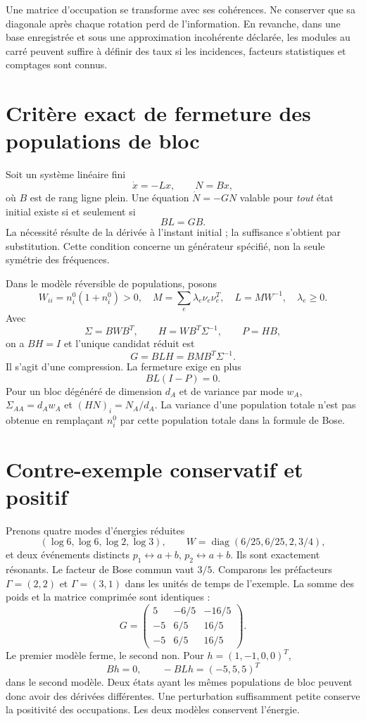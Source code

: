 \documentclass[11pt,a4paper]{article}
\begin{document}
Une matrice d'occupation se transforme avec ses cohérences. Ne conserver
que sa diagonale après chaque rotation perd de l'information.
En revanche, dans une base enregistrée et sous une approximation
incohérente déclarée, les modules au carré peuvent suffire à définir
des taux si les incidences, facteurs statistiques et comptages sont connus.

\section{Critère exact de fermeture des populations de bloc}
Soit un système linéaire fini
\[
 \dot x=-Lx,\qquad N=Bx,
\]
où $B$ est de rang ligne plein. Une équation $\dot N=-GN$ valable pour
\emph{tout} état initial existe si et seulement si
\[
                         BL=GB.
\]
La nécessité résulte de la dérivée à l'instant initial ; la suffisance
s'obtient par substitution. Cette condition concerne un générateur
spécifié, non la seule symétrie des fréquences.

Dans le modèle réversible de populations, posons
\[
 W_{ii}=n_i^0(1+n_i^0)>0,\quad
 M=\sum_e\lambda_e\nu_e\nu_e^T,\quad L=MW^{-1},\quad \lambda_e\ge0.
\]
Avec
\[
 \Sigma=BWB^T,\qquad H=WB^T\Sigma^{-1},\qquad P=HB,
\]
on a $BH=I$ et l'unique candidat réduit est
\[
 G=BLH=BMB^T\Sigma^{-1}.
\]
Il s'agit d'une compression. La fermeture exige en plus
\[
                         BL(I-P)=0.
\]
Pour un bloc dégénéré de dimension $d_A$ et de variance par mode $w_A$,
$\Sigma_{AA}=d_Aw_A$ et $(HN)_i=N_A/d_A$.
La variance d'une population totale n'est pas obtenue en remplaçant
$n_i^0$ par cette population totale dans la formule de Bose.

\section{Contre-exemple conservatif et positif}
Prenons quatre modes d'énergies réduites
\[
 (\log6,\log6,\log2,\log3),\qquad
 W=\operatorname{diag}(6/25,6/25,2,3/4),
\]
et deux événements distincts $p_1\leftrightarrow a+b$,
$p_2\leftrightarrow a+b$. Ils sont exactement résonants.
Le facteur de Bose commun vaut $3/5$. Comparons les préfacteurs
$\Gamma=(2,2)$ et $\Gamma=(3,1)$ dans les unités de temps de l'exemple.
La somme des poids et la matrice comprimée sont identiques :
\[
 G=\begin{pmatrix}
 5&-6/5&-16/5\\
 -5&6/5&16/5\\
 -5&6/5&16/5
 \end{pmatrix}.
\]
Le premier modèle ferme, le second non. Pour $h=(1,-1,0,0)^T$,
\[
 Bh=0,\qquad -BLh=(-5,5,5)^T
\]
dans le second modèle. Deux états ayant les mêmes populations de bloc
peuvent donc avoir des dérivées différentes.
Une perturbation suffisamment petite conserve la positivité des
occupations. Les deux modèles conservent l'énergie.
\end{document}
